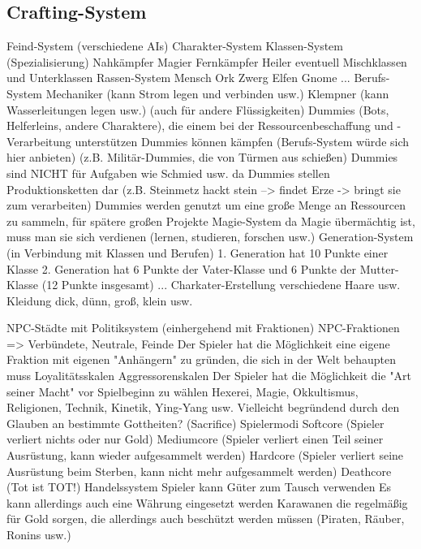     
    
    
    
\subsection{Crafting-System}
\label{subsec:crafting}
    Feind-System (verschiedene AIs)
    Charakter-System
    Klassen-System (Spezialisierung)
        Nahkämpfer
        Magier
        Fernkämpfer
        Heiler
        eventuell Mischklassen und Unterklassen
    Rassen-System
        Mensch
        Ork
        Zwerg
        Elfen
        Gnome
        ...
    Berufs-System
        Mechaniker (kann Strom legen und verbinden usw.)
        Klempner (kann Wasserleitungen legen usw.) (auch für andere Flüssigkeiten)
    Dummies (Bots, Helferleins, andere Charaktere), die einem bei der Ressourcenbeschaffung und -Verarbeitung unterstützen
        Dummies können kämpfen (Berufs-System würde sich hier anbieten) (z.B. Militär-Dummies, die von Türmen aus schießen)
        Dummies sind NICHT für Aufgaben wie Schmied usw. da
        Dummies stellen Produktionsketten dar (z.B. Steinmetz hackt stein --> findet Erze -> bringt sie zum verarbeiten)
        Dummies werden genutzt um eine große Menge an Ressourcen zu sammeln, für spätere großen Projekte
    Magie-System
        da Magie übermächtig ist, muss man sie sich verdienen (lernen, studieren, forschen usw.)
    Generation-System (in Verbindung mit Klassen und Berufen)
        1. Generation hat 10 Punkte einer Klasse
        2. Generation hat 6 Punkte der Vater-Klasse und 6 Punkte der Mutter-Klasse (12 Punkte insgesamt)
        ...
    Charkater-Erstellung
        verschiedene Haare usw.
        Kleidung
        dick, dünn, groß, klein usw.

    NPC-Städte mit Politiksystem (einhergehend mit Fraktionen)
    NPC-Fraktionen => Verbündete, Neutrale, Feinde
    Der Spieler hat die Möglichkeit eine eigene Fraktion mit eigenen "Anhängern" zu gründen, die sich in der Welt behaupten muss
        Loyalitätsskalen
        Aggressorenskalen
    Der Spieler hat die Möglichkeit die "Art seiner Macht" vor Spielbeginn zu wählen
        Hexerei, Magie, Okkultismus, Religionen, Technik, Kinetik, Ying-Yang usw.
        Vielleicht begründend durch den Glauben an bestimmte Gottheiten? (Sacrifice)
    Spielermodi
        Softcore (Spieler verliert nichts oder nur Gold)
        Mediumcore (Spieler verliert einen Teil seiner Ausrüstung, kann wieder aufgesammelt werden)
        Hardcore (Spieler verliert seine Ausrüstung beim Sterben, kann nicht mehr aufgesammelt werden)
        Deathcore (Tot ist TOT!)
    Handelssystem
        Spieler kann Güter zum Tausch verwenden
        Es kann allerdings auch eine Währung eingesetzt werden
        Karawanen die regelmäßig für Gold sorgen, die allerdings auch beschützt werden müssen (Piraten, Räuber, Ronins usw.)

